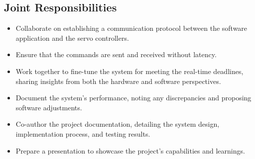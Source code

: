\documentclass[a4paper,11pt]{article}%
\newenvironment{qanda}{\setlength{\parindent}{0pt}}{\bigskip}
\begin{document}
\begin{qanda}
\begin{enumerate}
\begin{enumerate}
				      \subsection{Joint Responsibilities}
				      \begin{itemize}
					      \item Collaborate on establishing a communication protocol between the software application and the servo controllers.
					      \item Ensure that the commands are sent and received without latency.
					      \item  Work together to fine-tune the system for meeting the real-time deadlines, sharing insights from both the hardware and software perspectives.
					      \item Document the system's performance, noting any discrepancies and proposing software adjustments.
					      \item  Co-author the project documentation, detailing the system design, implementation process, and testing results.
					      \item Prepare a presentation to showcase the project's capabilities and learnings.
				      \end{itemize}
			\end{enumerate}

	\end{enumerate}


\end{qanda}
\end{document}
